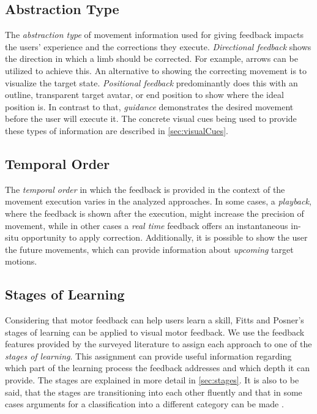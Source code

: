 \subsection*{Abstraction Type}
The \textit{abstraction type} of movement information used for giving feedback impacts the users' experience and the corrections they execute. \textit{Directional feedback} shows the direction in which a limb should be corrected. For example, arrows can be utilized to achieve this. An alternative to showing the correcting movement is to visualize the target state. \textit{Positional feedback} predominantly does this with an outline, transparent target avatar, or end position to show where the ideal position is. In contrast to that, \textit{guidance} demonstrates the desired movement before the user will execute it. The concrete visual cues being used to provide these types of information are described in \autoref{sec:visualCues}.

\subsection*{Temporal Order}
The \textit{temporal order} in which the feedback is provided in the context of the movement execution varies in the analyzed approaches. In some cases, a \textit{playback}, where the feedback is shown after the execution, might increase the precision of movement, while in other cases a \textit{real time} feedback offers an instantaneous in-situ opportunity to apply correction. Additionally, it is possible to show the user the future movements, which can provide information about \textit{upcoming} target motions.

\subsection*{Stages of Learning}
Considering that motor feedback can help users learn a skill, Fitts and Posner's \cite{fitts1967HPe} stages of learning can be applied to visual motor feedback.
We use the feedback features provided by the surveyed literature to assign each approach to one of the \textit{stages of learning}. This assignment can provide useful information regarding which part of the learning process the feedback addresses and which depth it can provide. The stages are explained in more detail in \autoref{sec:stages}. It is also to be said, that the stages are transitioning into each other fluently and that in some cases arguments for a classification into a different category can be made \cite{fitts1967HPe}. 

